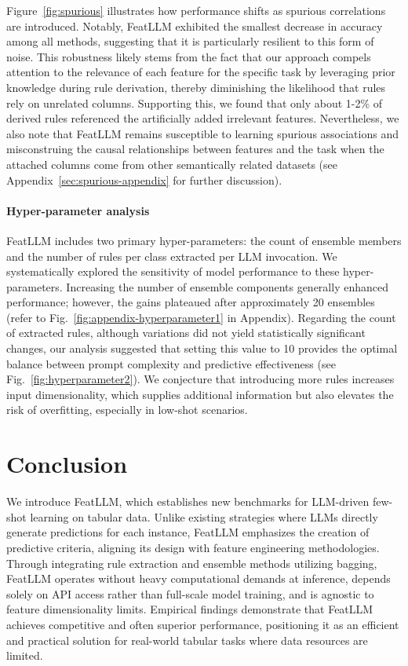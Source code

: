 Figure~\ref{fig:spurious} illustrates how performance shifts as spurious correlations are introduced. Notably, \textsf{FeatLLM} exhibited the smallest decrease in accuracy among all methods, suggesting that it is particularly resilient to this form of noise. This robustness likely stems from the fact that our approach compels attention to the relevance of each feature for the specific task by leveraging prior knowledge during rule derivation, thereby diminishing the likelihood that rules rely on unrelated columns. Supporting this, we found that only about 1-2\% of derived rules referenced the artificially added irrelevant features. Nevertheless, we also note that \textsf{FeatLLM} remains susceptible to learning spurious associations and misconstruing the causal relationships between features and the task when the attached columns come from other semantically related datasets (see Appendix~\ref{sec:spurious-appendix} for further discussion).

\vspace*{-0.12in}
\paragraph{Hyper-parameter analysis}
\textsf{FeatLLM} includes two primary hyper-parameters: the count of ensemble members and the number of rules per class extracted per LLM invocation. We systematically explored the sensitivity of model performance to these hyper-parameters. Increasing the number of ensemble components generally enhanced performance; however, the gains plateaued after approximately 20 ensembles (refer to Fig.~\ref{fig:appendix-hyperparameter1} in Appendix). Regarding the count of extracted rules, although variations did not yield statistically significant changes, our analysis suggested that setting this value to 10 provides the optimal balance between prompt complexity and predictive effectiveness (see Fig.~\ref{fig:hyperparameter2}). We conjecture that introducing more rules increases input dimensionality, which supplies additional information but also elevates the risk of overfitting, especially in low-shot scenarios.

\section{Conclusion}
We introduce \textsf{FeatLLM}, which establishes new benchmarks for LLM-driven few-shot learning on tabular data. Unlike existing strategies where LLMs directly generate predictions for each instance, \textsf{FeatLLM} emphasizes the creation of predictive criteria, aligning its design with feature engineering methodologies. Through integrating rule extraction and ensemble methods utilizing bagging, \textsf{FeatLLM} operates without heavy computational demands at inference, depends solely on API access rather than full-scale model training, and is agnostic to feature dimensionality limits. Empirical findings demonstrate that \textsf{FeatLLM} achieves competitive and often superior performance, positioning it as an efficient and practical solution for real-world tabular tasks where data resources are limited.

